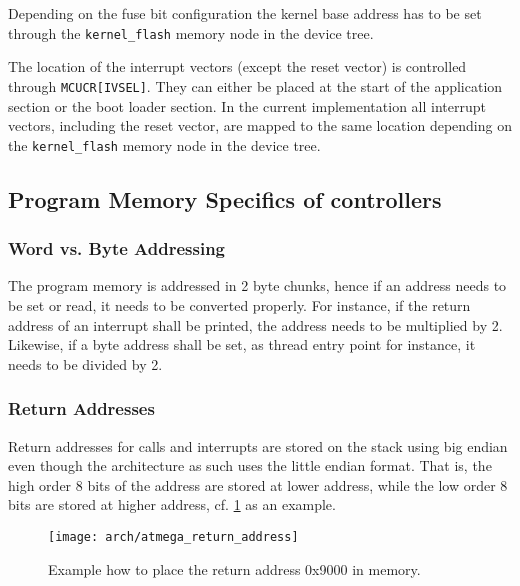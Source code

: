 		Depending on the fuse bit configuration the kernel base address has to be set through the \lstinline{kernel_flash} memory node in the device tree. 

		The location of the interrupt vectors (except the reset vector) is controlled through \lstinline{MCUCR[IVSEL]}. They can either be placed at the start of the application section or the boot loader section. In the current implementation all interrupt vectors, including the reset vector, are mapped to the same location depending on the \lstinline{kernel_flash} memory node in the device tree.

	\subsection{Program Memory Specifics of \atmega controllers}
		\subsubsection{Word vs. Byte Addressing}
			The \avr program memory is addressed in 2 byte chunks, hence if an address needs to be set or read, it needs to be converted properly. For instance, if the return address of an interrupt shall be printed, the address needs to be multiplied by 2. Likewise, if a byte address shall be set, as thread entry point for instance, it needs to be divided by 2.

		\subsubsection{Return Addresses}
			Return addresses for calls and interrupts are stored on the stack using big endian even though the \atmega architecture as such uses the little endian format. That is, the high order 8 bits of the address are stored at lower address, while the low order 8 bits are stored at higher address, cf. \ref{fig:atmega_return_address} as an example.
			\begin{figure}[h]
				\centering	
				\texttt{[image: arch/atmega\_return\_address]}
				\caption{Example how to place the return address 0x9000 in memory.}
				\label{fig:atmega_return_address}
			\end{figure}
